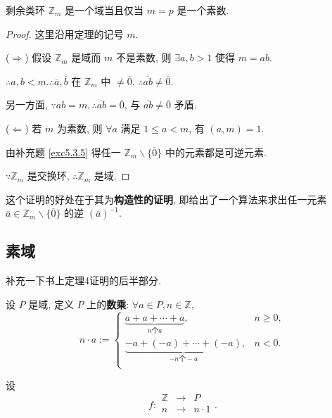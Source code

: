 \documentclass[color=black,device=normal,lang=cn,mode=geye]{elegantnote}
\begin{document}
\begin{theorem}[书上的定理3]
    剩余类环 $\mathbb{Z}_m$ 是一个域当且仅当 $m=p$ 是一个素数.
\end{theorem}
\begin{proof}
    这里沿用定理的记号 $m$.

    ($\Rightarrow$) 假设 $\mathbb{Z}_m$ 是域而 $m$ 不是素数, 则 $\exists a,b>1$ 使得 $m=ab$.

    $\therefore a,b<m.\therefore\overline{a},\overline{b}$ 在 $\mathbb{Z}_m$ 中 $\neq\overline{0}$. $\therefore\overline{ab}\neq\overline{0}$.

    另一方面, $\because ab=m,\therefore\overline{ab}=\overline{0}$, 与 $\overline{ab}\neq\overline{0}$ 矛盾.

    ($\Leftarrow$) 若 $m$ 为素数, 则 $\forall a$ 满足 $1\leq a<m$, 有 $(a,m)=1$.

    由补充题 \ref{exc5.3.5} 得任一 $\mathbb{Z}_m\backslash\{\overline{0}\}$ 中的元素都是可逆元素.

    $\because\mathbb{Z}_m$ 是交换环, $\therefore\mathbb{Z}_m$ 是域.
\end{proof}
这个证明的好处在于其为\textbf{构造性的证明}, 即给出了一个算法来求出任一元素 $\overline{a}\in\mathbb{Z}_m\backslash\{\overline{0}\}$ 的逆 $(\overline{a})^{-1}$.
\subsection{素域}
补充一下书上定理4证明的后半部分.

设 $P$ 是域, 定义 $P$ 上的\textbf{数乘}: $\forall a\in P,n\in\mathbb{Z}$,
\[n\cdot a:=\begin{cases}
    \underbrace{a+a+\cdots+a}_{n\text{个}a}, & n\geq0, \\
    \underbrace{-a+(-a)+\cdots+(-a)}_{-n\text{个}-a}, & n<0. \\
\end{cases}\]

设
\[f:\begin{array}{rcl}
    \mathbb{Z} & \to & P \\
    n & \to & n\cdot1 \\
\end{array}.\]
\end{document}
